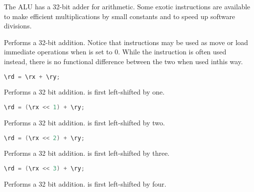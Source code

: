 The \rvex{} ALU has a 32-bit adder for arithmetic. Some exotic instructions are
available to make efficient multiplications by small constants and to speed up
software divisions.

Performs a 32-bit addition. Notice that  instructions may be used as
move or load immediate operations when  is set to 0. While the 
instruction is often used instead, there is no functional difference between the
two when used inthis way.

\begin{lstlisting}[numbers=none, basicstyle=\ttfamily\footnotesize, language=C++]
\rd = \rx + \ry;
\end{lstlisting}

Performs a 32 bit addition. \code{\rx} is first left-shifted by one.

\begin{lstlisting}[numbers=none, basicstyle=\ttfamily\footnotesize, language=C++]
\rd = (\rx << 1) + \ry;
\end{lstlisting}

Performs a 32 bit addition. \code{\rx} is first left-shifted by two.

\begin{lstlisting}[numbers=none, basicstyle=\ttfamily\footnotesize, language=C++]
\rd = (\rx << 2) + \ry;
\end{lstlisting}

Performs a 32 bit addition. \code{\rx} is first left-shifted by three.

\begin{lstlisting}[numbers=none, basicstyle=\ttfamily\footnotesize, language=C++]
\rd = (\rx << 3) + \ry;
\end{lstlisting}

Performs a 32 bit addition. \code{\rx} is first left-shifted by four.

